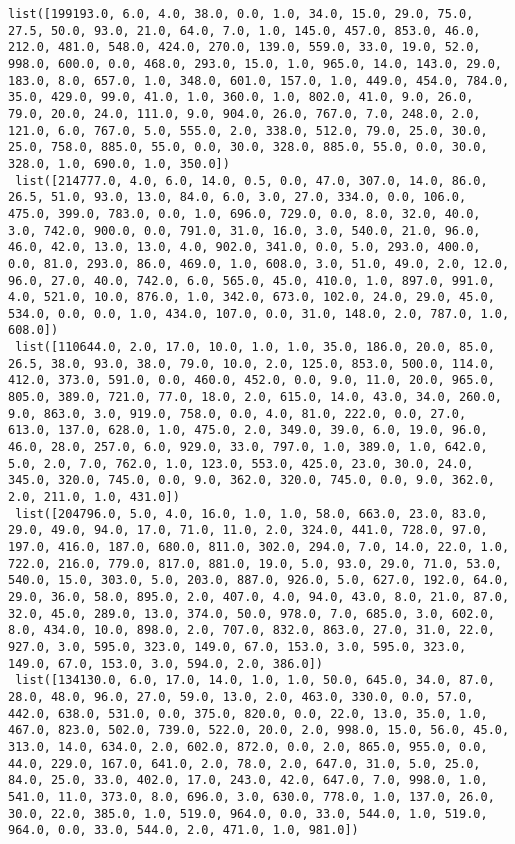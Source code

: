 \documentclass[11pt]{article}
\begin{document}
\begin{Verbatim}[commandchars=\\\{\}]
 list([199193.0, 6.0, 4.0, 38.0, 0.0, 1.0, 34.0, 15.0, 29.0, 75.0, 27.5, 50.0, 93.0, 21.0, 64.0, 7.0, 1.0, 145.0, 457.0, 853.0, 46.0, 212.0, 481.0, 548.0, 424.0, 270.0, 139.0, 559.0, 33.0, 19.0, 52.0, 998.0, 600.0, 0.0, 468.0, 293.0, 15.0, 1.0, 965.0, 14.0, 143.0, 29.0, 183.0, 8.0, 657.0, 1.0, 348.0, 601.0, 157.0, 1.0, 449.0, 454.0, 784.0, 35.0, 429.0, 99.0, 41.0, 1.0, 360.0, 1.0, 802.0, 41.0, 9.0, 26.0, 79.0, 20.0, 24.0, 111.0, 9.0, 904.0, 26.0, 767.0, 7.0, 248.0, 2.0, 121.0, 6.0, 767.0, 5.0, 555.0, 2.0, 338.0, 512.0, 79.0, 25.0, 30.0, 25.0, 758.0, 885.0, 55.0, 0.0, 30.0, 328.0, 885.0, 55.0, 0.0, 30.0, 328.0, 1.0, 690.0, 1.0, 350.0])
 list([214777.0, 4.0, 6.0, 14.0, 0.5, 0.0, 47.0, 307.0, 14.0, 86.0, 26.5, 51.0, 93.0, 13.0, 84.0, 6.0, 3.0, 27.0, 334.0, 0.0, 106.0, 475.0, 399.0, 783.0, 0.0, 1.0, 696.0, 729.0, 0.0, 8.0, 32.0, 40.0, 3.0, 742.0, 900.0, 0.0, 791.0, 31.0, 16.0, 3.0, 540.0, 21.0, 96.0, 46.0, 42.0, 13.0, 13.0, 4.0, 902.0, 341.0, 0.0, 5.0, 293.0, 400.0, 0.0, 81.0, 293.0, 86.0, 469.0, 1.0, 608.0, 3.0, 51.0, 49.0, 2.0, 12.0, 96.0, 27.0, 40.0, 742.0, 6.0, 565.0, 45.0, 410.0, 1.0, 897.0, 991.0, 4.0, 521.0, 10.0, 876.0, 1.0, 342.0, 673.0, 102.0, 24.0, 29.0, 45.0, 534.0, 0.0, 0.0, 1.0, 434.0, 107.0, 0.0, 31.0, 148.0, 2.0, 787.0, 1.0, 608.0])
 list([110644.0, 2.0, 17.0, 10.0, 1.0, 1.0, 35.0, 186.0, 20.0, 85.0, 26.5, 38.0, 93.0, 38.0, 79.0, 10.0, 2.0, 125.0, 853.0, 500.0, 114.0, 412.0, 373.0, 591.0, 0.0, 460.0, 452.0, 0.0, 9.0, 11.0, 20.0, 965.0, 805.0, 389.0, 721.0, 77.0, 18.0, 2.0, 615.0, 14.0, 43.0, 34.0, 260.0, 9.0, 863.0, 3.0, 919.0, 758.0, 0.0, 4.0, 81.0, 222.0, 0.0, 27.0, 613.0, 137.0, 628.0, 1.0, 475.0, 2.0, 349.0, 39.0, 6.0, 19.0, 96.0, 46.0, 28.0, 257.0, 6.0, 929.0, 33.0, 797.0, 1.0, 389.0, 1.0, 642.0, 5.0, 2.0, 7.0, 762.0, 1.0, 123.0, 553.0, 425.0, 23.0, 30.0, 24.0, 345.0, 320.0, 745.0, 0.0, 9.0, 362.0, 320.0, 745.0, 0.0, 9.0, 362.0, 2.0, 211.0, 1.0, 431.0])
 list([204796.0, 5.0, 4.0, 16.0, 1.0, 1.0, 58.0, 663.0, 23.0, 83.0, 29.0, 49.0, 94.0, 17.0, 71.0, 11.0, 2.0, 324.0, 441.0, 728.0, 97.0, 197.0, 416.0, 187.0, 680.0, 811.0, 302.0, 294.0, 7.0, 14.0, 22.0, 1.0, 722.0, 216.0, 779.0, 817.0, 881.0, 19.0, 5.0, 93.0, 29.0, 71.0, 53.0, 540.0, 15.0, 303.0, 5.0, 203.0, 887.0, 926.0, 5.0, 627.0, 192.0, 64.0, 29.0, 36.0, 58.0, 895.0, 2.0, 407.0, 4.0, 94.0, 43.0, 8.0, 21.0, 87.0, 32.0, 45.0, 289.0, 13.0, 374.0, 50.0, 978.0, 7.0, 685.0, 3.0, 602.0, 8.0, 434.0, 10.0, 898.0, 2.0, 707.0, 832.0, 863.0, 27.0, 31.0, 22.0, 927.0, 3.0, 595.0, 323.0, 149.0, 67.0, 153.0, 3.0, 595.0, 323.0, 149.0, 67.0, 153.0, 3.0, 594.0, 2.0, 386.0])
 list([134130.0, 6.0, 17.0, 14.0, 1.0, 1.0, 50.0, 645.0, 34.0, 87.0, 28.0, 48.0, 96.0, 27.0, 59.0, 13.0, 2.0, 463.0, 330.0, 0.0, 57.0, 442.0, 638.0, 531.0, 0.0, 375.0, 820.0, 0.0, 22.0, 13.0, 35.0, 1.0, 467.0, 823.0, 502.0, 739.0, 522.0, 20.0, 2.0, 998.0, 15.0, 56.0, 45.0, 313.0, 14.0, 634.0, 2.0, 602.0, 872.0, 0.0, 2.0, 865.0, 955.0, 0.0, 44.0, 229.0, 167.0, 641.0, 2.0, 78.0, 2.0, 647.0, 31.0, 5.0, 25.0, 84.0, 25.0, 33.0, 402.0, 17.0, 243.0, 42.0, 647.0, 7.0, 998.0, 1.0, 541.0, 11.0, 373.0, 8.0, 696.0, 3.0, 630.0, 778.0, 1.0, 137.0, 26.0, 30.0, 22.0, 385.0, 1.0, 519.0, 964.0, 0.0, 33.0, 544.0, 1.0, 519.0, 964.0, 0.0, 33.0, 544.0, 2.0, 471.0, 1.0, 981.0])

\end{Verbatim}
\end{document}
